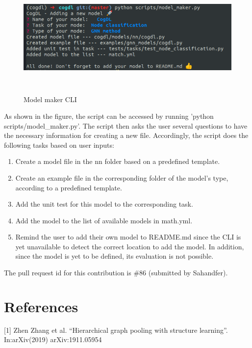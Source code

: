 \documentclass[12pt,a4paper]{article}
\begin{document}
	\begin{figure}[H]
		\centering
		\includegraphics[width=15cm, height=6cm]{Figures/model}
		\vspace{-0.7cm}
		\caption{Model maker CLI}
	\end{figure}

	\noindent As shown in the figure, the script can be accessed by running 'python scripts/model\_maker.py'. The script then asks the user several questions to have the necessary information for creating a new file. Accordingly, the script does the following tasks based on user inputs:
	
	\begin{enumerate}
		\item Create a model file in the nn folder based on a predefined template.
		\item Create an example file in the corresponding folder of the model's type, according to a predefined template.
		\item Add the unit test for this model to the corresponding task.
		\item Add the model to the list of available models in math.yml.
		\item Remind the user to add their own model to README.md since the CLI is yet unavailable to detect the correct location to add the model. In addition, since the model is yet to be defined, its evaluation is not possible.
	\end{enumerate}

	\noindent The pull request id for this contribution is \#86 (submitted by Sahandfer).
	
	\section*{References}
	[1] Zhen Zhang et al. “Hierarchical graph pooling with structure learning”. In:arXiv(2019) arXiv:1911.05954


	
\end{document}
